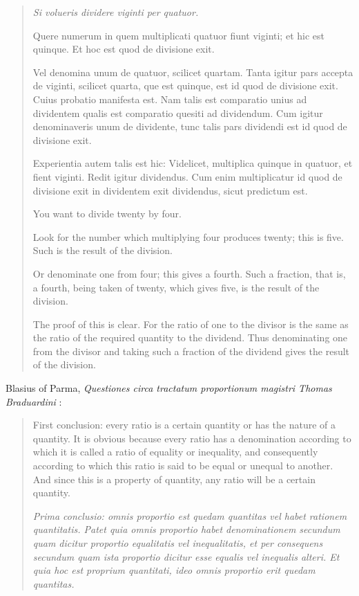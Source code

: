\documentclass{article}
\begin{document}
\begin{quote}
{\em Si volueris dividere viginti per quatuor.

Quere numerum in quem multiplicati quatuor fiunt viginti; et hic est
quinque. Et hoc est quod de divisione exit.

Vel denomina unum de quatuor, scilicet quartam. Tanta igitur pars accepta de viginti, scilicet quarta, que est quinque, est id quod de divisione exit.
Cuius probatio manifesta est. Nam talis est comparatio unius ad dividentem qualis est comparatio quesiti ad dividendum. Cum igitur denominaveris unum de dividente, tunc talis pars dividendi est id quod de divisione exit.

Experientia autem talis est hic: Videlicet, multiplica quinque in quatuor, et fient viginti. Redit igitur dividendus. Cum enim multiplicatur id quod de divisione exit in dividentem exit dividendus, sicut predictum est.}

You want to divide twenty by four.

Look for the number which multiplying four produces twenty; this
is five. Such is the result of the division.

Or denominate one from four; this gives a fourth. Such a fraction, that is, a fourth, being taken of twenty, which gives five, is the result of the division.

The proof of this is clear. For the ratio of one to the divisor is the same as the ratio of the required quantity to the dividend. Thus denominating one from the divisor and taking such a fraction of the dividend gives the result of the division.
\end{quote}










Blasius of Parma, {\em Questiones circa tractatum proportionum magistri Thomas Braduardini} \cite[pp.~701--702]{rommevaux}:

\begin{quote}
First conclusion: every ratio is a certain quantity or has the nature of a quantity.  It is obvious because every ratio has a denomination according to which it is called a ratio of equality or inequality, and consequently according to which this ratio is said to be equal or unequal to another. And since this is a property of quantity, any ratio will be a certain quantity.

{\em Prima conclusio: omnis proportio est quedam quantitas vel habet rationem quantitatis. Patet quia omnis proportio habet denominationem secundum quam dicitur proportio equalitatis vel inequalitatis,
 et per consequens secundum quam ista proportio dicitur esse equalis vel inequalis alteri. Et quia hoc est proprium quantitati, ideo omnis proportio erit quedam quantitas.}
\end{quote}
\end{document}
